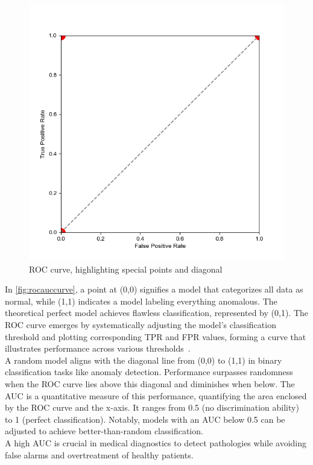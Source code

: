 \begin{figure}[h!]
  \centering
  \includegraphics[width=0.5\linewidth]{images/rocauc}
  \caption{
  ROC curve, highlighting special points and diagonal
}
\label{fig:rocauccurve}
\end{figure}

In \autoref{fig:rocauccurve}, a point at (0,0) signifies a model that categorizes all data as normal, while (1,1) indicates a model labeling everything anomalous. The theoretical perfect model achieves flawless classification, represented by (0,1). The ROC curve emerges by systematically adjusting the model's classification threshold and plotting corresponding TPR and FPR values, forming a curve that illustrates performance across various thresholds~\cite{fawcett2006introduction}.\\
A random model aligns with the diagonal line from (0,0) to (1,1) in binary classification tasks like anomaly detection. Performance surpasses randomness when the ROC curve lies above this diagonal and diminishes when below. The AUC is a quantitative measure of this performance, quantifying the area enclosed by the ROC curve and the x-axis. It ranges from 0.5 (no discrimination ability) to 1 (perfect classification). Notably, models with an AUC below 0.5 can be adjusted to achieve better-than-random classification.\\
A high AUC is crucial in medical diagnostics to detect pathologies while avoiding false alarms and overtreatment of healthy patients.

